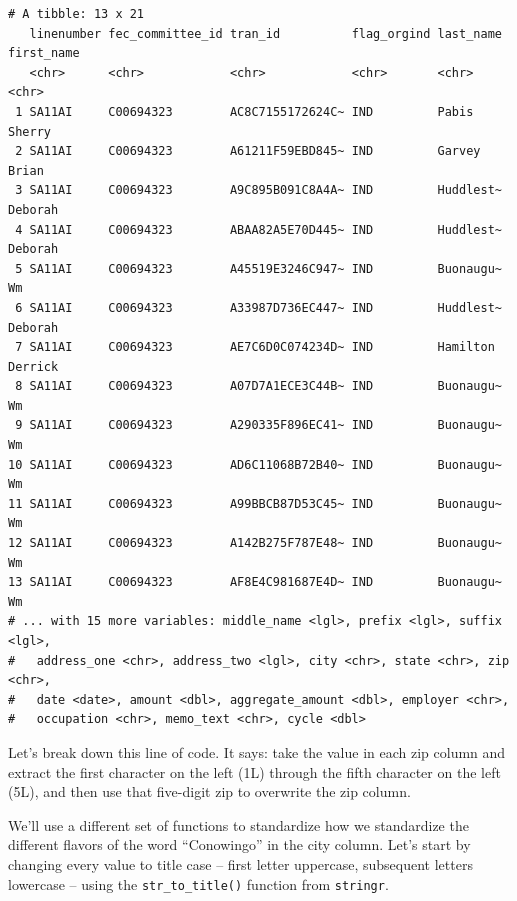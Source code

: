 \documentclass[
  letterpaper,
  DIV=11,
  numbers=noendperiod]{scrreprt}
\begin{document}
\begin{verbatim}
# A tibble: 13 x 21
   linenumber fec_committee_id tran_id          flag_orgind last_name first_name
   <chr>      <chr>            <chr>            <chr>       <chr>     <chr>     
 1 SA11AI     C00694323        AC8C7155172624C~ IND         Pabis     Sherry    
 2 SA11AI     C00694323        A61211F59EBD845~ IND         Garvey    Brian     
 3 SA11AI     C00694323        A9C895B091C8A4A~ IND         Huddlest~ Deborah   
 4 SA11AI     C00694323        ABAA82A5E70D445~ IND         Huddlest~ Deborah   
 5 SA11AI     C00694323        A45519E3246C947~ IND         Buonaugu~ Wm        
 6 SA11AI     C00694323        A33987D736EC447~ IND         Huddlest~ Deborah   
 7 SA11AI     C00694323        AE7C6D0C074234D~ IND         Hamilton  Derrick   
 8 SA11AI     C00694323        A07D7A1ECE3C44B~ IND         Buonaugu~ Wm        
 9 SA11AI     C00694323        A290335F896EC41~ IND         Buonaugu~ Wm        
10 SA11AI     C00694323        AD6C11068B72B40~ IND         Buonaugu~ Wm        
11 SA11AI     C00694323        A99BBCB87D53C45~ IND         Buonaugu~ Wm        
12 SA11AI     C00694323        A142B275F787E48~ IND         Buonaugu~ Wm        
13 SA11AI     C00694323        AF8E4C981687E4D~ IND         Buonaugu~ Wm        
# ... with 15 more variables: middle_name <lgl>, prefix <lgl>, suffix <lgl>,
#   address_one <chr>, address_two <lgl>, city <chr>, state <chr>, zip <chr>,
#   date <date>, amount <dbl>, aggregate_amount <dbl>, employer <chr>,
#   occupation <chr>, memo_text <chr>, cycle <dbl>
\end{verbatim}

Let's break down this line of code. It says: take the value in each zip
column and extract the first character on the left (1L) through the
fifth character on the left (5L), and then use that five-digit zip to
overwrite the zip column.

We'll use a different set of functions to standardize how we standardize
the different flavors of the word ``Conowingo'' in the city column.
Let's start by changing every value to title case -- first letter
uppercase, subsequent letters lowercase -- using the
\texttt{str\_to\_title()} function from \texttt{stringr}.
\end{document}
